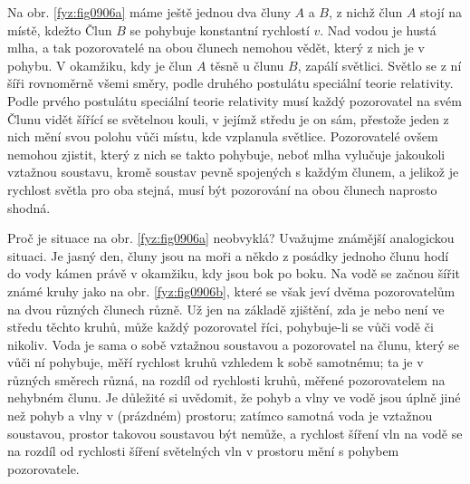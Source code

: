 \begin{mdframed}[style=mdexam]
  \begin{example}\label{fyz:fey_exam017}
    Na obr. \ref{fyz:fig0906a} máme ještě jednou dva čluny \(A\) a \(B\), z nichž člun \(A\) stojí na
    místě, kdežto Člun \(B\) se pohybuje konstantní rychlostí \(v\). Nad vodou je hustá mlha, a tak
    pozorovatelé na obou člunech nemohou vědět, který z nich je v pohybu. V okamžiku, kdy je člun
    \(A\) těsně u člunu \(B\), zapálí světlici. Světlo se z ní šíři rovnoměrně všemi směry, podle
    druhého postulátu speciální teorie relativity. Podle prvého postulátu speciální teorie
    relativity musí každý pozorovatel na svém Člunu vidět šířící se světelnou kouli, v jejímž středu
    je on sám, přestože jeden z nich mění svou polohu vůči místu, kde vzplanula světlice.
    Pozorovatelé ovšem nemohou zjistit, který z nich se takto pohybuje, neboť mlha vylučuje
    jakoukoli vztažnou soustavu, kromě soustav pevně spojených s každým člunem, a jelikož je
    rychlost světla pro oba stejná, musí být pozorování na obou člunech naprosto shodná.

    {\centering
    \captionsetup{type=figure}
    \par}
    \vspace{1em}

    Proč je situace na obr. \ref{fyz:fig0906a} neobvyklá? Uvažujme známější analogickou situaci. Je
    jasný den, čluny jsou na moři a někdo z posádky jednoho člunu hodí do vody kámen právě v
    okamžiku, kdy jsou bok po boku. Na vodě se začnou šířit známé kruhy jako na obr.
    \ref{fyz:fig0906b}, které se však jeví dvěma pozorovatelům na dvou různých člunech různě. Už jen
    na základě zjištění, zda je nebo není ve středu těchto kruhů, může každý pozorovatel říci,
    pohybuje-li se vůči vodě či nikoliv. Voda je sama o sobě vztažnou soustavou a pozorovatel na
    člunu, který se vůči ní pohybuje, měří rychlost kruhů vzhledem k sobě samotnému; ta je v různých
    směrech různá, na rozdíl od rychlosti kruhů, měřené pozorovatelem na nehybném člunu. Je důležité
    si uvědomit, že pohyb a vlny ve vodě jsou úplně jiné než pohyb a vlny v (prázdném) prostoru;
    zatímco samotná voda je vztažnou soustavou, prostor takovou soustavou být nemůže, a rychlost
    šíření vln na vodě se na rozdíl od rychlosti šíření světelných vln v prostoru mění s pohybem
    pozorovatele.

    {\centering
    \captionsetup{type=figure}
    \par}
    \vspace{1em}

  \end{example}
\end{mdframed}